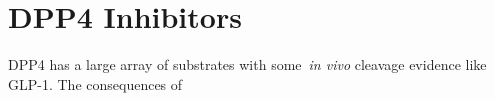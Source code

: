 \section{DPP4 Inhibitors}
DPP4 has a large array of substrates with some~\textit{in vivo} cleavage evidence like GLP-1. The consequences of 